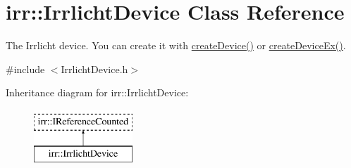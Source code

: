 \hypertarget{classirr_1_1IrrlichtDevice}{}\section{irr\+:\+:Irrlicht\+Device Class Reference}
\label{classirr_1_1IrrlichtDevice}


The Irrlicht device. You can create it with \hyperlink{namespaceirr_abaf4d8719cc26b0d30813abf85e47c76}{create\+Device()} or \hyperlink{namespaceirr_ac83a30d674204dcb94d70f849e9b4a62}{create\+Device\+Ex()}.  




{\ttfamily \#include $<$Irrlicht\+Device.\+h$>$}

Inheritance diagram for irr\+:\+:Irrlicht\+Device\+:\begin{figure}[H]
\begin{center}
\leavevmode
\includegraphics[height=2.000000cm]{classirr_1_1IrrlichtDevice}
\end{center}
\end{figure}
